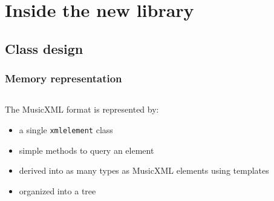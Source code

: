 \documentclass{paper}
\begin{document}
\section{Inside the new library}
\subsection{Class design}
\begin{frame}
	\frametitle{Memory representation}
	\begin{columns}
		\begin{column}[c]{7cm}
		The MusicXML format is represented by:
		{\small
 			  \begin{itemize}
			  \item<1-> a single \texttt{xmlelement} class
			  \item<3-> simple methods to query an element
			  \item<5-> derived into as many types as MusicXML elements using templates
			  \item<7-> organized into a tree
			  \end{itemize}}
		\end{column}


\end{columns}
\end{frame}
\end{document}
